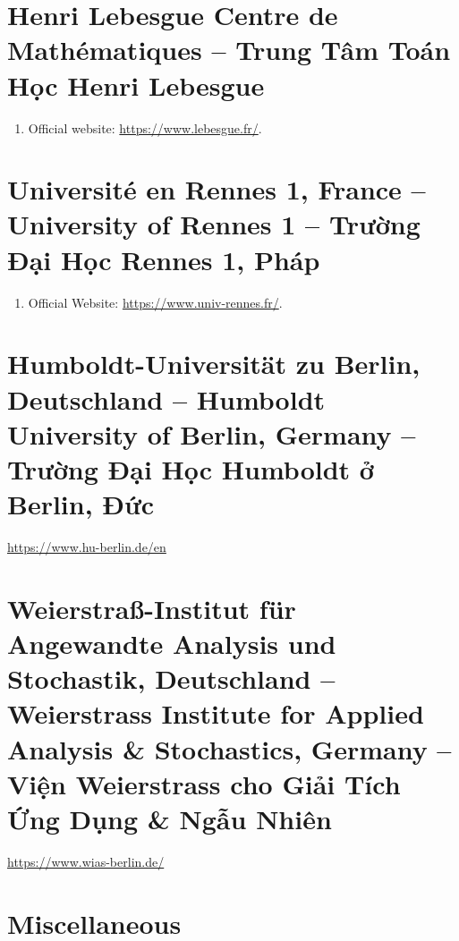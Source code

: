\documentclass{article}
\begin{document}
\section{Henri Lebesgue Centre de Math\'ematiques -- Trung Tâm Toán Học Henri Lebesgue}
\begin{enumerate}
	\item Official website: \url{https://www.lebesgue.fr/}.
\end{enumerate}


\section{Universit\'e en Rennes 1, France -- University of Rennes 1 -- Trường Đại Học Rennes 1, Pháp}
\begin{enumerate}
	\item Official Website: \url{https://www.univ-rennes.fr/}.
\end{enumerate}


\section{Humboldt-Universität zu Berlin, Deutschland -- Humboldt University of Berlin, Germany -- Trường Đại Học Humboldt ở Berlin, Đức}
\url{https://www.hu-berlin.de/en}


\section{Weierstraß-Institut für Angewandte Analysis und Stochastik, Deutschland -- Weierstrass Institute for Applied Analysis \& Stochastics, Germany -- Viện Weierstrass cho Giải Tích Ứng Dụng \& Ngẫu Nhiên}
\url{https://www.wias-berlin.de/}


\section{Miscellaneous}


\printbibliography[heading=bibintoc]
	
\end{document}
